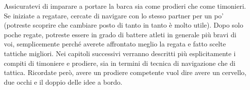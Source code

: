 Assicuratevi di imparare a portare la barca sia come prodieri che
come timonieri. Se iniziate a regatare, cercate di navigare con lo stesso partner per un
po' (potreste scoprire che cambiare posto di tanto in tanto è molto utile). Dopo
solo poche regate, potreste essere in grado di battere atleti in generale più
bravi di voi, semplicemente perché averete affrontato meglio la regata e fatto
scelte tattiche migliori. Nei capitoli successivi verranno descritti più
esplicitamente i compiti di timoniere e prodiere, sia
in termini di tecnica di navigazione che di tattica. Ricordate però, avere un
prodiere competente vuol dire avere un cervello, due occhi e il doppio delle idee a bordo.

